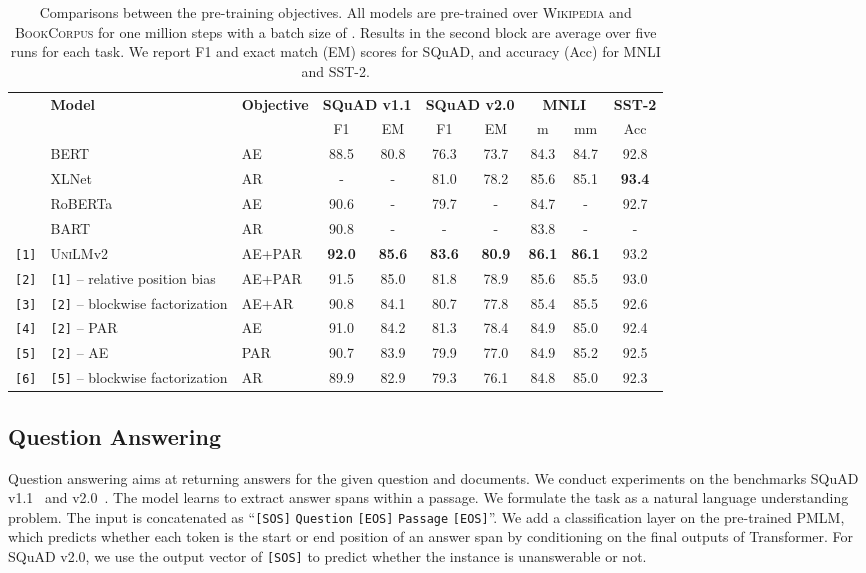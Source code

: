 \documentclass{article}
\newcommand\pmlm{\textsc{PMLM}}
\newcommand{\bertbase}{BERT}
\newcommand{\bartbase}{BART}
\newcommand{\xlnetbase}{XLNet}
\newcommand{\robertabase}{RoBERTa}
\newcommand{\vtwobase}{\textsc{UniLM}v2}
\newcommand\norelposfull{-- relative position bias}
\newcommand{\sptk}[1]{\texttt{[#1]}}
\newcommand{\tblidx}[1]{{\small \texttt{[#1]}}}
\begin{document}
\begin{table*}[t]
\centering
\begin{tabular}{lllccccccc}
\toprule
& \multirow{2}{*}{\bf Model} & \multirow{2}{*}{\bf Objective} & \multicolumn{2}{c}{\textbf{SQuAD v1.1}} & \multicolumn{2}{c}{\textbf{SQuAD v2.0}} & \multicolumn{2}{c}{\textbf{MNLI}} & {\bf SST-2} \\
& & & F1 & EM & F1 & EM & m & mm & Acc \\
\midrule
&\bertbase{} & AE & 88.5 & 80.8 & 76.3 & 73.7 & 84.3 & 84.7 & 92.8 \\
&\xlnetbase{} & AR & - & - & 81.0 & 78.2 & 85.6 & 85.1 & \textbf{93.4} \\
&\robertabase{} & AE & 90.6 & - & 79.7 & - & 84.7 & - & 92.7 \\
&\bartbase{} & AR & 90.8 & - & - & - & 83.8 & - & - \\
\midrule
\tblidx{1} &\vtwobase{} & AE+PAR & \textbf{92.0} & \textbf{85.6} & \textbf{83.6} & \textbf{80.9} & \textbf{86.1} & \textbf{86.1} & 93.2  \\
\tblidx{2} &\tblidx{1} \norelposfull & AE+PAR & 91.5 & 85.0 & 81.8 & 78.9 & 85.6 & 85.5 & 93.0 \\
\tblidx{3} &\tblidx{2} -- blockwise factorization & AE+AR & 90.8 & 84.1 & 80.7 & 77.8 & 85.4 & 85.5 & 92.6 \\
\tblidx{4} &\tblidx{2} -- PAR & AE & 91.0 & 84.2 & 81.3 & 78.4 & 84.9 & 85.0 & 92.4 \\
\tblidx{5} &\tblidx{2} -- AE & PAR & 90.7 & 83.9 & 79.9 & 77.0 & 84.9 & 85.2 & 92.5 \\
\tblidx{6} &\tblidx{5} -- blockwise factorization & AR & 89.9 & 82.9 & 79.3 & 76.1 & 84.8 & 85.0 & 92.3 \\
\bottomrule
\end{tabular}
\caption{
Comparisons between the pre-training objectives.
All models are pre-trained over \textsc{Wikipedia} and \textsc{BookCorpus} for one million steps with a batch size of .
Results in the second block are average over five runs for each task.
We report F1 and exact match (EM) scores for SQuAD, and accuracy (Acc) for MNLI and SST-2.
}
\label{tbl:base_1Mstep}
\end{table*}


\subsection{Question Answering}
\label{sec:qa}

Question answering aims at returning answers for the given question and documents.
We conduct experiments on the benchmarks SQuAD v1.1~\cite{squad1} and v2.0~\cite{squad2}.
The model learns to extract answer spans within a passage.
We formulate the task as a natural language understanding problem.
The input is concatenated as ``\sptk{SOS} \texttt{Question} \sptk{EOS} \texttt{Passage} \sptk{EOS}''.
We add a classification layer on the pre-trained \pmlm{}, which predicts whether each token is the start or end position of an answer span by conditioning on the final outputs of Transformer.
For SQuAD v2.0, we use the output vector of \sptk{SOS} to predict whether the instance is unanswerable or not.
\end{document}
